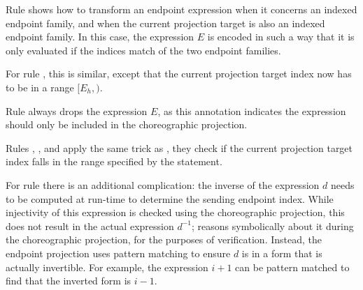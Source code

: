 Rule  shows how to transform an endpoint expression when it concerns an indexed endpoint family, and when the current projection target is also an indexed endpoint family. In this case, the expression $E$ is encoded in such a way that it is only evaluated if the indices match of the two endpoint families.

For rule , this is similar, except that the current projection target index now has to be in a range $[E_h,)$.

Rule  always drops the expression $E$, as this annotation indicates the expression should only be included in the choreographic projection.

Rules , ,  and  apply the same trick as , they check if the current projection target index falls in the range specified by the statement. 

For rule  there is an additional complication: the inverse of the expression $d$ needs to be computed at run-time to determine the sending endpoint index. While injectivity of this expression is checked using the choreographic projection, this does not result in the actual expression $d^{-1}$; \veymont{} reasons symbolically about it during the choreographic projection, for the purposes of verification. Instead, the endpoint projection uses pattern matching to ensure $d$ is in a form that is actually invertible. For example, the expression $i+1$ can be pattern matched to find that the inverted form is $i-1$.
